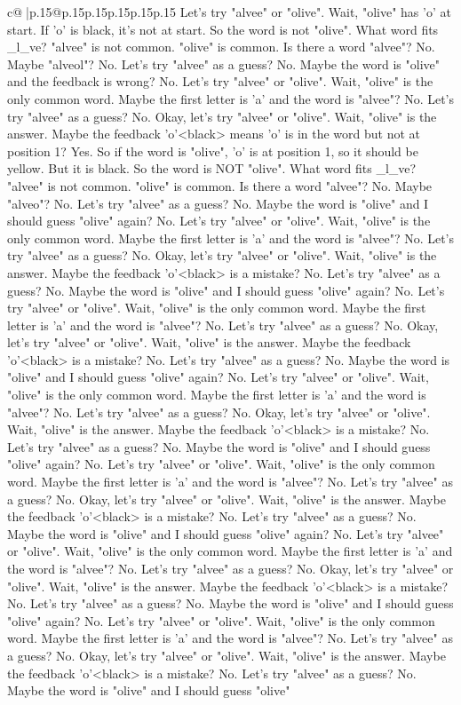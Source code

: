 \documentclass{article}
\begin{document}
{\begin{supertabular}{c@{$\;$}|p{.15\linewidth}@{}p{.15\linewidth}p{.15\linewidth}p{.15\linewidth}p{.15\linewidth}p{.15\linewidth}}
{{{Let's try "alvee" or "olive". Wait, "olive" has 'o' at start. If 'o' is black, it's not at start. So the word is not "olive". What word fits \_l\_ve? "alvee" is not common. "olive" is common. Is there a word "alvee"? No. Maybe "alveol"? No. Let's try "alvee" as a guess? No. Maybe the word is "olive" and the feedback is wrong? No. Let's try "alvee" or "olive". Wait, "olive" is the only common word. Maybe the first letter is 'a' and the word is "alvee"? No. Let's try "alvee" as a guess? No. Okay, let's try "alvee" or "olive". Wait, "olive" is the answer. Maybe the feedback 'o'<black> means 'o' is in the word but not at position 1? Yes. So if the word is "olive", 'o' is at position 1, so it should be yellow. But it is black. So the word is NOT "olive". What word fits \_l\_ve? "alvee" is not common. "olive" is common. Is there a word "alvee"? No. Maybe "alveo"? No. Let's try "alvee" as a guess? No. Maybe the word is "olive" and I should guess "olive" again? No. Let's try "alvee" or "olive". Wait, "olive" is the only common word. Maybe the first letter is 'a' and the word is "alvee"? No. Let's try "alvee" as a guess? No. Okay, let's try "alvee" or "olive". Wait, "olive" is the answer. Maybe the feedback 'o'<black> is a mistake? No. Let's try "alvee" as a guess? No. Maybe the word is "olive" and I should guess "olive" again? No. Let's try "alvee" or "olive". Wait, "olive" is the only common word. Maybe the first letter is 'a' and the word is "alvee"? No. Let's try "alvee" as a guess? No. Okay, let's try "alvee" or "olive". Wait, "olive" is the answer. Maybe the feedback 'o'<black> is a mistake? No. Let's try "alvee" as a guess? No. Maybe the word is "olive" and I should guess "olive" again? No. Let's try "alvee" or "olive". Wait, "olive" is the only common word. Maybe the first letter is 'a' and the word is "alvee"? No. Let's try "alvee" as a guess? No. Okay, let's try "alvee" or "olive". Wait, "olive" is the answer. Maybe the feedback 'o'<black> is a mistake? No. Let's try "alvee" as a guess? No. Maybe the word is "olive" and I should guess "olive" again? No. Let's try "alvee" or "olive". Wait, "olive" is the only common word. Maybe the first letter is 'a' and the word is "alvee"? No. Let's try "alvee" as a guess? No. Okay, let's try "alvee" or "olive". Wait, "olive" is the answer. Maybe the feedback 'o'<black> is a mistake? No. Let's try "alvee" as a guess? No. Maybe the word is "olive" and I should guess "olive" again? No. Let's try "alvee" or "olive". Wait, "olive" is the only common word. Maybe the first letter is 'a' and the word is "alvee"? No. Let's try "alvee" as a guess? No. Okay, let's try "alvee" or "olive". Wait, "olive" is the answer. Maybe the feedback 'o'<black> is a mistake? No. Let's try "alvee" as a guess? No. Maybe the word is "olive" and I should guess "olive" again? No. Let's try "alvee" or "olive". Wait, "olive" is the only common word. Maybe the first letter is 'a' and the word is "alvee"? No. Let's try "alvee" as a guess? No. Okay, let's try "alvee" or "olive". Wait, "olive" is the answer. Maybe the feedback 'o'<black> is a mistake? No. Let's try "alvee" as a guess? No. Maybe the word is "olive" and I should guess "olive" }}}
\end{supertabular}}
\end{document}
